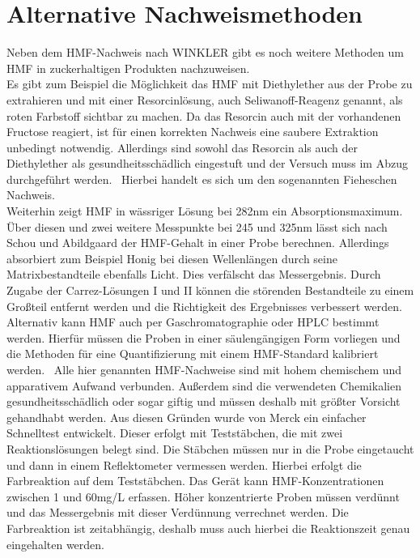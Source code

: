 \section{Alternative Nachweismethoden}

Neben dem HMF-Nachweis nach WINKLER gibt es noch weitere Methoden um HMF in zuckerhaltigen Produkten nachzuweisen.\\
Es gibt zum Beispiel die Möglichkeit das HMF mit Diethylether aus der Probe zu extrahieren und mit einer Resorcinlösung, auch Seliwanoff-Reagenz genannt, als roten Farbstoff sichtbar zu machen. Da das Resorcin auch mit der vorhandenen Fructose reagiert, ist für einen korrekten Nachweis eine saubere Extraktion unbedingt notwendig. Allerdings sind sowohl das Resorcin als auch der Diethylether als gesundheitsschädlich eingestuft und der Versuch muss im Abzug durchgeführt werden.~\cite{Resorcinnachweis} Hierbei handelt es sich um den sogenannten Fieheschen Nachweis.~\cite{Winkler}\\
Weiterhin zeigt HMF in wässriger Lösung bei 282nm ein Absorptionsmaximum. Über diesen und zwei weitere Messpunkte bei 245 und 325nm lässt sich nach Schou und Abildgaard der HMF-Gehalt in einer Probe berechnen. Allerdings absorbiert zum Beispiel Honig bei diesen Wellenlängen durch seine Matrixbestandteile ebenfalls Licht. Dies verfälscht das Messergebnis. Durch Zugabe der Carrez-Lösungen I und II können die störenden Bestandteile zu einem Großteil entfernt werden und die Richtigkeit des Ergebnisses verbessert werden.~\cite{Winkler}
Alternativ kann HMF auch per Gaschromatographie oder HPLC bestimmt werden. Hierfür müssen die Proben in einer säulengängigen Form vorliegen und die Methoden für eine Quantifizierung mit einem HMF-Standard kalibriert werden.~\cite{Patent}
Alle hier genannten HMF-Nachweise sind mit hohem chemischem und apparativem Aufwand verbunden. Außerdem sind die verwendeten Chemikalien gesundheitsschädlich oder sogar giftig und müssen deshalb mit größter Vorsicht gehandhabt werden. Aus diesen Gründen wurde von Merck ein einfacher Schnelltest entwickelt. Dieser erfolgt mit Teststäbchen, die mit zwei Reaktionslösungen belegt sind. Die Stäbchen müssen nur in die Probe eingetaucht und dann in einem Reflektometer vermessen werden. Hierbei erfolgt die Farbreaktion auf dem Teststäbchen. Das Gerät kann HMF-Konzentrationen zwischen 1 und 60mg/L erfassen. Höher konzentrierte Proben müssen verdünnt und das Messergebnis mit dieser Verdünnung verrechnet werden. Die Farbreaktion ist zeitabhängig, deshalb muss auch hierbei die Reaktionszeit genau eingehalten werden.~\cite{Merck}

